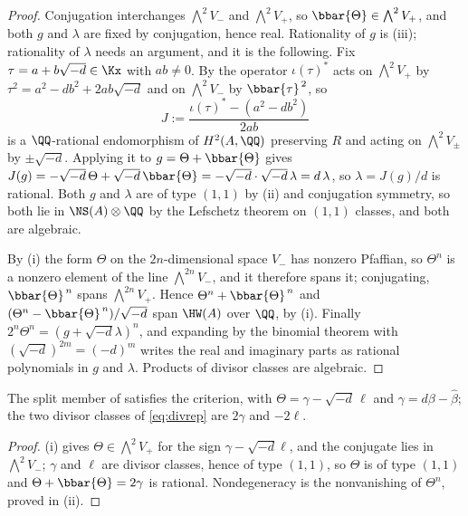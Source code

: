 \begin{proof}
Conjugation interchanges $\bigwedge^{2}V_{-}$ and $\bigwedge^{2}V_{+}$, so
$\bbar{\Theta}\in\bigwedge^{2}V_{+}$, and both $g$ and $\lambda$ are fixed by
conjugation, hence real. Rationality of $g$ is (iii); rationality of
$\lambda$ needs an argument, and it is the following. Fix
$\tau=a+b\sqrt{-d}\in\Kx$ with $ab\ne0$. By  the operator
$\iota(\tau)^{*}$ acts on $\bigwedge^{2}V_{+}$ by $\tau^{2}=a^{2}-db^{2}+2ab\sqrt{-d}$
and on $\bigwedge^{2}V_{-}$ by $\bbar{\tau}^{\,2}$, so
\[
  J:=\frac{\iota(\tau)^{*}-(a^{2}-db^{2})}{2ab}
\]
is a $\QQ$-rational endomorphism of $H^{2}(A,\QQ)$ preserving $R$ and acting
on $\bigwedge^{2}V_{\pm}$ by $\pm\sqrt{-d}$. Applying it to
$g=\Theta+\bbar{\Theta}$ gives $J(g)=-\sqrt{-d}\,\Theta+\sqrt{-d}\,\bbar{\Theta}
=-\sqrt{-d}\cdot\sqrt{-d}\,\lambda=d\,\lambda$, so $\lambda=J(g)/d$ is
rational. Both $g$ and $\lambda$ are of type $(1,1)$ by (ii) and conjugation
symmetry, so both lie in $\NS(A)\otimes\QQ$ by the Lefschetz theorem on
$(1,1)$ classes, and both are algebraic.

By (i) the form $\Theta$ on the $2n$-dimensional space $V_{-}$ has nonzero
Pfaffian, so $\Theta^{n}$ is a nonzero element of the line
$\bigwedge^{2n}V_{-}$, and it therefore spans it; conjugating,
$\bbar{\Theta}^{\,n}$ spans $\bigwedge^{2n}V_{+}$. Hence
$\Theta^{n}+\bbar{\Theta}^{\,n}$ and
$(\Theta^{n}-\bbar{\Theta}^{\,n})/\sqrt{-d}$ span $\HW(A)$ over $\QQ$, by
(i). Finally
$2^{n}\Theta^{n}=(g+\sqrt{-d}\lambda)^{n}$, and expanding by the binomial
theorem with $(\sqrt{-d})^{2m}=(-d)^{m}$ writes the real and imaginary parts
as rational polynomials in $g$ and $\lambda$. Products of divisor classes are
algebraic.
\end{proof}

\begin{corollary}\label{cor:splitsatisfies}
The split member of  satisfies the criterion, with
$\Theta=\gamma-\sqrt{-d}\,\ell$ and $\gamma=d\beta-\widehat{\beta}$; the two
divisor classes of \eqref{eq:divrep} are $2\gamma$ and $-2\ell$.
\end{corollary}

\begin{proof}
(i) gives $\Theta\in\bigwedge^{2}V_{+}$ for the sign
$\gamma-\sqrt{-d}\ell$, and the conjugate lies in $\bigwedge^{2}V_{-}$;
$\gamma$ and $\ell$ are divisor classes, hence of type $(1,1)$, so $\Theta$ is
of type $(1,1)$ and $\Theta+\bbar{\Theta}=2\gamma$ is rational.
Nondegeneracy is the nonvanishing of $\Theta^{n}$, proved in
(ii).
\end{proof}

